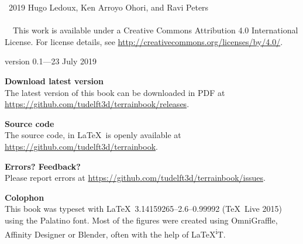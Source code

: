 
\clearpage
\thispagestyle{empty}
\null%
\vfill


\textcopyright\ 2019 Hugo Ledoux, Ken Arroyo Ohori, and Ravi Peters
\\ \\
\ccLogo\ \ccAttribution\ This work is available under a Creative Commons Attribution 4.0 International License.
For license details, see \url{http://creativecommons.org/licenses/by/4.0/}.


version 0.1---23 July 2019


\textbf{Download latest version} \\
The latest version of this book can be downloaded in PDF at \url{https://github.com/tudelft3d/terrainbook/releases}.


\textbf{Source code} \\
The source code, in \LaTeX\, is openly available at \url{https://github.com/tudelft3d/terrainbook}.


\textbf{Errors? Feedback?} \\
Please report errors at \url{https://github.com/tudelft3d/terrainbook/issues}.

\textbf{Colophon} \\
This book was typeset with \LaTeX\ 3.14159265--2.6--0.99992 (\TeX\ Live 2015) using the Palatino font.
Most of the figures were created using OmniGraffle, Affinity Designer or Blender, often with the help of \LaTeX{}\textsuperscript{i}T.
